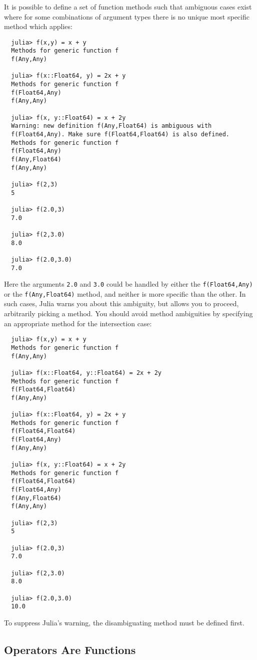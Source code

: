 \documentclass{article}
\renewcommand{\sec}[1]{\label{sec:#1}}
\begin{document}
It is possible to define a set of function methods such that ambiguous cases exist where for some combinations of argument types there is no unique most specific method which applies:
\begin{verbatim}
  julia> f(x,y) = x + y
  Methods for generic function f
  f(Any,Any)

  julia> f(x::Float64, y) = 2x + y
  Methods for generic function f
  f(Float64,Any)
  f(Any,Any)

  julia> f(x, y::Float64) = x + 2y
  Warning: new definition f(Any,Float64) is ambiguous with
  f(Float64,Any). Make sure f(Float64,Float64) is also defined.
  Methods for generic function f
  f(Float64,Any)
  f(Any,Float64)
  f(Any,Any)

  julia> f(2,3)
  5

  julia> f(2.0,3)
  7.0

  julia> f(2,3.0)
  8.0

  julia> f(2.0,3.0)
  7.0
\end{verbatim}
Here the arguments \verb|2.0| and \verb|3.0| could be handled by either the \verb|f(Float64,Any)| or the \verb|f(Any,Float64)| method, and neither is more specific than the other.
In such cases, Julia warns you about this ambiguity, but allows you to proceed, arbitrarily picking a method.
You should avoid method ambiguities by specifying an appropriate method for the intersection case:
\begin{verbatim}
  julia> f(x,y) = x + y
  Methods for generic function f
  f(Any,Any)

  julia> f(x::Float64, y::Float64) = 2x + 2y
  Methods for generic function f
  f(Float64,Float64)
  f(Any,Any)

  julia> f(x::Float64, y) = 2x + y
  Methods for generic function f
  f(Float64,Float64)
  f(Float64,Any)
  f(Any,Any)

  julia> f(x, y::Float64) = x + 2y
  Methods for generic function f
  f(Float64,Float64)
  f(Float64,Any)
  f(Any,Float64)
  f(Any,Any)

  julia> f(2,3)
  5

  julia> f(2.0,3)
  7.0

  julia> f(2,3.0)
  8.0

  julia> f(2.0,3.0)
  10.0
\end{verbatim}
To suppress Julia's warning, the disambiguating method must be defined first.

\subsection{Operators Are Functions}\sec{operators-are-functions}
\end{document}

